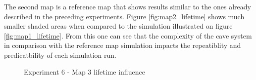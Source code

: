 The second map is a reference map that shows results similar to the ones already described in the preceding experiments.
Figure \ref{fig:map2_lifetime} shows much smaller shaded areas when compared to the simulation illustrated on figure \ref{fig:map1_lifetime}.
From this one can see that the complexity of the cave system in comparison with the reference map simulation impacts the repeatiblity and predicatbility of each simulation run.

\begin{figure}[H]
    \centering

    \hspace*{\fill}

    \hspace*{\fill}

    \caption{Experiment 6 - Map 3 lifetime influence}\label{fig:map3_lifetime}
\end{figure}

